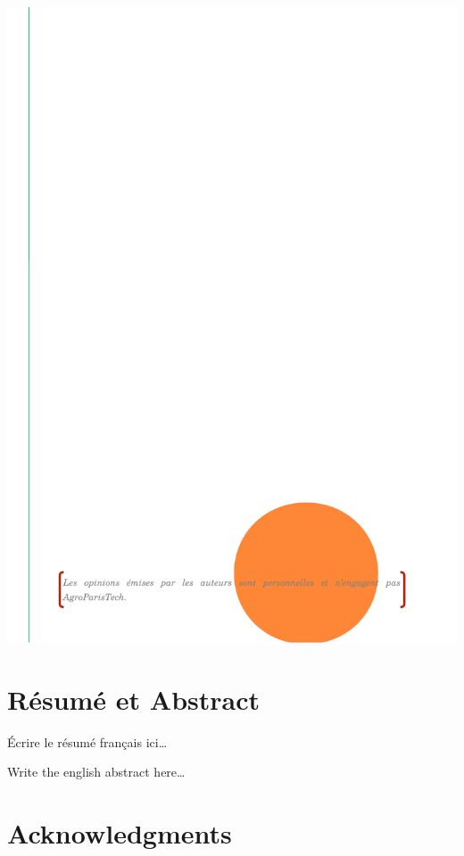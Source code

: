 \documentclass[]{article}
\theoremstyle{definition}
\theoremstyle{definition}
\theoremstyle{remark}
\begin{document}
\thispagestyle{empty}
\begin{center}
\includegraphics{images/second.pdf}
\end{center}

\setlength{\abovedisplayskip}{-5pt}
\setlength{\abovedisplayshortskip}{-5pt}

{
\hypersetup{linkcolor=black}
\setcounter{tocdepth}{2}
\tableofcontents
}
\section*{Résumé et Abstract}\label{resume-et-abstract}

Écrire le résumé français ici\ldots{}

Write the english abstract here\ldots{}

\section*{Acknowledgments}\label{acknowledgments}
\end{document}

